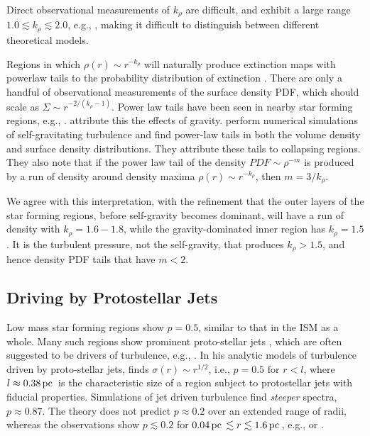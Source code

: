 \documentclass[iop,apj,numberedappendix]{emulateapj}
\newcommand       \pc		{\,{\rm pc \,}}
\begin{document}
Direct observational measurements of $k_\rho$ are difficult, and
exhibit a large range $1.0\lesssim k_\rho\lesssim 2.0$, e.g.,
\citep{2000ApJ...537..283V,2014ApJ...785...42P}, making it difficult
to distinguish between different theoretical models. 

Regions in which $\rho(r)\sim r^{-k_\rho}$ will naturally produce
extinction maps with powerlaw tails to the probability distribution of
extinction \citep{2011ApJ...727L..20K}.  There are only a handful of
observational measurements of the surface density PDF, which should
scale as $\Sigma\sim r^{-2/(k_\rho -1)}$. Power law tails have been
seen in nearby star forming regions, e.g.,
\citet{1999A&A...345..965C,2009ApJ...703...52L,2009A&A...508L..35K}. \citet{2010A&A...512A..67L}
attribute this the effects of gravity. \citet{2011ApJ...727L..20K}
perform numerical simulations of self-gravitating turbulence and find
power-law tails in both the volume density and surface density
distributions. They attribute these tails to collapsing regions. They
also note that if the power law tail of the density $PDF
\sim\rho^{-m}$ is produced by a run of density around density maxima
$\rho(r)\sim r^{-k_\rho}$, then $m=3/k_\rho$.

We agree with this interpretation, with the refinement that the outer
layers of the star forming regions, before self-gravity becomes
dominant, will have a run of density with $k_\rho=1.6-1.8$, while the
gravity-dominated inner region has $k_\rho=1.5$. It is the turbulent
pressure, not the self-gravity, that produces $k_\rho>1.5$, and hence
density PDF tails that have $m<2$. 


\subsection{Driving by Protostellar Jets}
Low mass star forming regions show $p=0.5$, similar to that in the ISM
as a whole. Many such regions show prominent proto-stellar jets
\citet{2001ARA&A..39..403R}, which are often suggested to be drivers
of turbulence, e.g., \citet{2005ApJ...632..941Q}. In his analytic
models of turbulence driven by proto-stellar jets,
\citet{2007ApJ...659.1394M} finds $\sigma(r)\sim r^{1/2}$, i.e.,
$p=0.5$ for $r<l$, where $l\approx0.38\pc$ is the characteristic size
of a region subject to protostellar jets with fiducial
properties. Simulations of jet driven turbulence
\citep{2009ApJ...695.1376C} find {\em steeper} spectra,
$p\approx0.87$. The theory does not predict $p\approx0.2$ over an extended
range of radii, whereas the observations show $p\lesssim0.2$ for
$0.04\pc\lesssim r\lesssim 1.6\pc$, e.g., \citep{1995ApJ...446..665C}
or \citep{1997ApJ...476..730P}.
\end{document}
